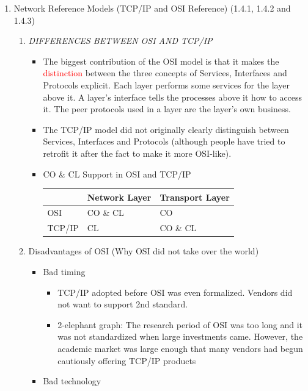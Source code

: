\documentclass[a4paper,10pt]{article}
\newcommand{\red}[1]{\textcolor{red}{#1}}
\begin{document}
\begin{enumerate}
  \item Network Reference Models (TCP/IP and OSI Reference) (1.4.1, 1.4.2 and 1.4.3)
    \begin{enumerate}
      \item\textit{DIFFERENCES BETWEEN OSI AND TCP/IP}
        \begin{itemize}
          \item The biggest contribution of the OSI model is that it makes the \red{distinction} between the three concepts of Services, Interfaces and Protocols explicit.
            \newline Each layer performs some services for the layer above it.
            \newline A layer's interface tells the processes above it how to access it.
            \newline The peer protocols used in a layer are the layer's own business.
          \item The TCP/IP model did not originally clearly distinguish between Services, Interfaces and Protocols (although people have tried to retrofit it after the fact to make it more OSI-like).
          \item CO \& CL Support in OSI and TCP/IP
            \newline\begin{tabular}{l | l | l}
              & Network Layer & Transport Layer \\ \hline
              OSI & CO \& CL & CO \\
              TCP/IP & CL & CO \& CL
            \end{tabular}
        \end{itemize}
      \item Disadvantages of OSI (Why OSI did not take over the world)
        \begin{itemize}
          \item Bad timing
            \begin{itemize}
              \item TCP/IP adopted before OSI was even formalized. Vendors did not want to support 2nd standard.
              \item 2-elephant graph: The research period of OSI was too long and it was not standardized when large investments came. However, the academic market was large enough that many vendors had begun cautiously offering TCP/IP products
            \end{itemize}
          \item Bad technology

\end{itemize}
\end{enumerate}
\end{enumerate}
\end{document}
